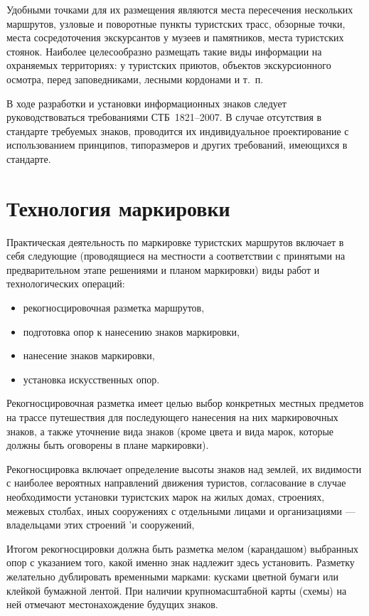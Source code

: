\documentclass[a4paper,12pt,titlepage]{extarticle}
\begin{document}
Удобными точками для их размещения являются места пересечения нескольких маршрутов, узловые и поворотные пункты
туристских трасс, обзорные точки, места сосредоточения экскурсантов у музеев и памятников, места туристских стоянок.
Наиболее целесообразно размещать такие виды информации на охраняемых территориях: у туристских приютов, объектов
экскурсионного осмотра, перед заповедниками, лесными кордонами и т.~п.

В ходе разработки и установки информационных знаков следует руководствоваться требованиями СТБ~1821--2007. В случае
отсутствия в стандарте требуемых знаков, проводится их индивидуальное проектирование с использованием принципов,
типоразмеров и других требований, имеющихся в стандарте.

\section{Технология маркировки}

Практическая деятельность по маркировке туристских маршрутов включает в себя следующие (проводящиеся на местности а
соответствии с принятыми на предварительном этапе решениями и планом маркировки) виды работ и технологических операций:

\begin{itemize}
	\item рекогносцировочная разметка маршрутов,
	\item подготовка опор к нанесению знаков маркировки,
	\item нанесение знаков маркировки,
	\item установка искусственных опор.
\end{itemize}

Рекогносцировочная разметка имеет целью выбор конкретных местных предметов на трассе путешествия для последующего
нанесения на них маркировочных знаков, а также уточнение вида знаков (кроме цвета и вида марок, которые должны быть
оговорены в плане маркировки).

Рекогносцировка включает определение высоты знаков над землей, их видимости с наиболее вероятных направлений движения
туристов, согласование в случае необходимости установки туристских марок на жилых домах, строениях, межевых столбах,
иных сооружениях с отдельными лицами и организациями --- владельцами этих строений 'и сооружений,

Итогом рекогносцировки должна быть разметка мелом (карандашом) выбранных опор с указанием того, какой именно знак
надлежит здесь установить. Разметку желательно дублировать временными марками: кусками цветной бумаги или клейкой
бумажной лентой. При наличии крупномасштабной карты (схемы) на ней отмечают местонахождение будущих знаков.
\end{document}
